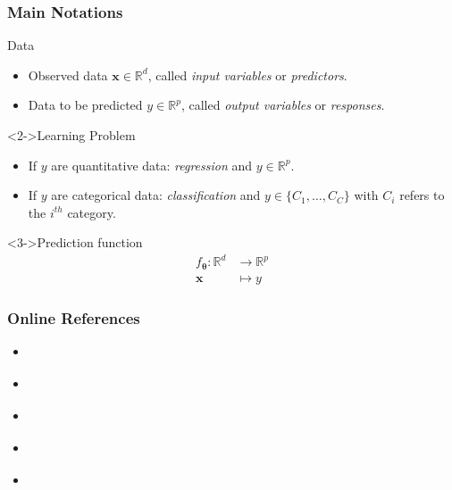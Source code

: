 \documentclass[pressentation,10pt,aspectratio=169,xcolor=table, colorlinks=true]{beamer}
\begin{document}
\begin{frame}
  \frametitle{Main Notations}
  \begin{block}{Data}
    \begin{itemize}
    \item Observed data \(\mathbf{x}\in \mathbb{R}^d\), called \emph{input variables} or \emph{predictors}.
    \item Data to be predicted \(y\in \mathbb{R}^p\), called \emph{output variables} or \emph{responses}.
    \end{itemize}
  \end{block}

  \begin{block}<2->{Learning Problem}
    \begin{itemize}
    \item If \(y\) are quantitative data: \emph{regression} and \(y\in\mathbb{R}^p\).
    \item If \(y\) are categorical data:  \emph{classification} and \(y\in\{C_1, \ldots, C_C\}\) with \(C_i\) refers to the \(i^{th}\) category.
    \end{itemize}
  \end{block}

  \begin{block}<3->{Prediction function}
    \begin{align*}
      f_{\boldsymbol{\theta}}: \mathbb{R}^d & \to  \mathbb{R}^p\\
      \mathbf{x} &  \mapsto  y
    \end{align*}
  \end{block}
\end{frame}

\begin{frame}
  \frametitle{Online References}

  \begin{itemize}
  \item \cite{zhang2021dive}
    
  \item \cite{prince2023understanding}

  \item \cite{mlbook2022}

  \item \cite{pml1Book}

  \item \cite{pml2Book}
  \end{itemize}
  
\end{frame}
\end{document}
